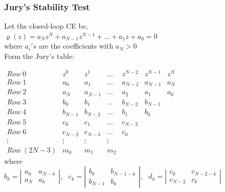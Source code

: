 \documentclass[mathserif, 10pt]{beamer} %
\begin{document}
\frame
{
\normalsize
\frametitle{Jury's Stability Test}

Let the closed-loop CE be, \\
$\varrho (z) = a_Nz^N+a_{N-1}z^{N-1}+\hdots + a_1z+a_0 = 0$\\
where $a_i's$ are the coefficients with $a_N>0$\\
Form the Jury's table: \vspace{.15in}

$\begin{array}{ccccccc}
	Row~0&z^0&z^1& \hdots&z^{N-2} & z^{N-1}&z^{N}\\
	Row~1&a_0&a_1&\hdots&a_{N-2}&a_{N-1} &a_N\\
	Row~2&a_N&a_{N-1} &\hdots&a_2&a_1&a_0\\
	Row~3&b_0&b_1&\hdots&b_{N-2}&b_{N-1}\\
	Row~4&b_{N-1}&b_{N-2}&\hdots&b_1&b_0\\
	Row~5&c_0&c_1&\hdots&c_{N-2}\\
	Row~6&c_{N-2}&c_{N-3}&\hdots&c_0\\
	\vdots&\vdots&\vdots&\vdots\\
	 Row~(2N-3)&m_0&m_1&m_2

\end{array}$\\ \vspace{.15in}
where \\
$b_k = \left|
\begin{array}{cc}
	a_0&a_{N-k}\\
	a_N&a_k
\end{array} \right|$,~
$c_k = \left|
\begin{array}{cc}
	b_0&b_{N-1-k}\\
	b_{N-1}&b_k
\end{array} \right|$,~ $d_k = \left|
\begin{array}{cc}
	c_0&c_{N-2-k}\\
	c_{N-2}&c_k
\end{array} \right|$

}
\end{document}
